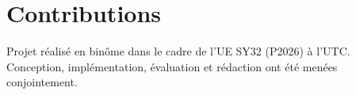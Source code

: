 \documentclass[a4paper,10pt]{article}
\begin{document}
\section*{Contributions}
Projet réalisé en binôme dans le cadre de l'UE SY32 (P2026) à l'UTC.
Conception, implémentation, évaluation et rédaction ont été menées conjointement.
\end{document}
